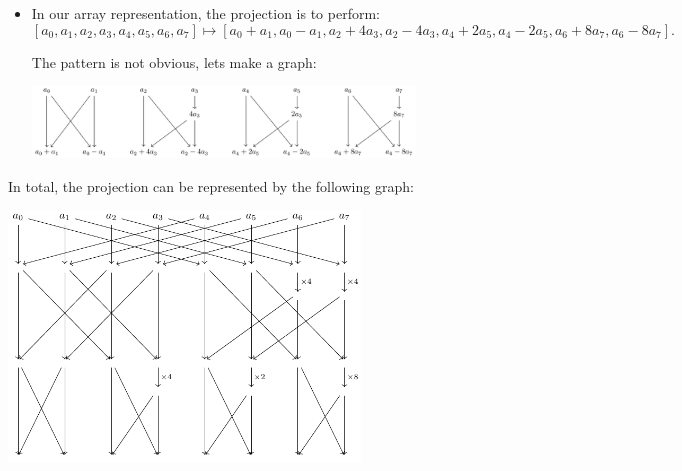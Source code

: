\begin{frame}
    \begin{itemize}
        \item In our array representation, the projection is to perform:
        \[ 
        [a_{0}, a_{1}, a_{2}, a_{3}, a_{4}, a_{5}, a_{6}, a_{7}] \mapsto 
        [a_{0} + a_{1}, a_{0} - a_{1}, a_{2} + 4a_{3}, a_{2} - 4a_{3}, a_{4} + 2a_{5}, a_{4} - 2a_{5}, a_{6} + 8a_{7}, a_{6} - 8a_{7}].
        \]
    
        The pattern is not obvious, lets make a graph: 
        \begin{center}
            \includegraphics[width=0.8\textwidth]{tikzcd4.pdf}
        \end{center}
        

    \end{itemize}
\end{frame}

\begin{frame}
    In total, the projection can be represented by the following graph:
    \begin{center}
        \includegraphics[width=0.7\textwidth]{tikzcd5.pdf}
    \end{center}
\end{frame}

